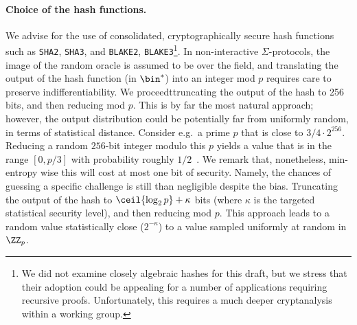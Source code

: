 \documentclass[runningheads,11pt]{article}
\begin{document}
 \paragraph{Choice of the hash functions.} We advise for the use of consolidated, cryptographically secure hash functions such as \verb|SHA2|, \verb|SHA3|, and \verb|BLAKE2|, \verb|BLAKE3|\footnote{We did not examine closely algebraic hashes for this draft, but we stress that their adoption could be appealing for a number of applications requiring recursive proofs. Unfortunately, this requires a much deeper cryptanalysis within a working group.}.
 In non-interactive $\Sigma$-protocols, the image of the random oracle is assumed to be over the field, and translating the output of the hash function (in $\bin^*$) into an integer mod $p$ requires care to preserve indifferentiability.
We proceedttruncating the output of the hash to 256 bits, and then reducing mod $p$.
  This is by far the most natural approach; however, the output distribution could be potentially far from uniformly random, in terms of statistical distance.
 Consider e.g.\ a prime $p$ that is close to $3/4 \cdot 2^{256}$. Reducing a random $256$-bit integer modulo this $p$ yields a value that is in the range $[0, p / 3]$ with probability roughly $1/2$~\cite{hash-to-curve}.
  We remark that, nonetheless, min-entropy wise this will cost at most one bit of security.
  Namely, the chances of guessing a specific challenge is still than negligible despite the bias.
   Truncating the output of the hash to $\ceil{\log_2 p} + \kappa$ bits (where $\kappa$ is the targeted statistical
  security level), and then reducing mod $p$.
  This approach leads to a random value statistically close ($2^{-\kappa}$) to a value sampled uniformly at random in $\ZZ_p$.
\end{document}
